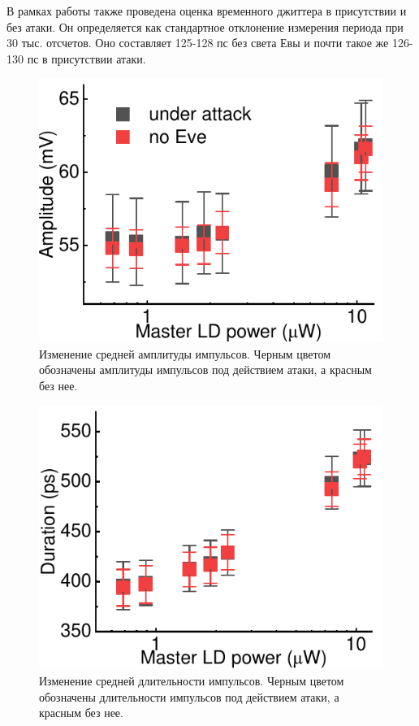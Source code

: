 В рамках работы также проведена оценка временного джиттера в присутствии и без атаки. Он определяется как стандартное отклонение измерения периода при 30 тыс. отсчетов. Оно составляет 125-128 пс  без света Евы и почти такое же 126-130 пс в присутствии атаки. 

\begin{figure}%
	\centering
	\includegraphics[width=\linewidth]{images/amplitude_change.pdf}
	\caption{Изменение средней амплитуды импульсов. Черным цветом обозначены амплитуды импульсов под действием атаки, а красным без нее.}
\end{figure}
\label{fig:amplitude}

\begin{figure}%
	\includegraphics[width=\linewidth]{images/duration_change.pdf}
	\caption{Изменение средней длительности импульсов. Черным цветом обозначены длительности импульсов под действием атаки, а красным без нее.}
\end{figure}
\label{fig:duration}

